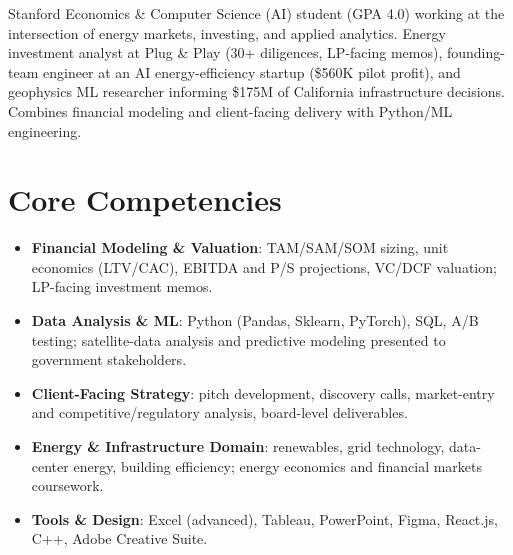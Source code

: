 \documentclass[11pt,a4paper,sans]{moderncv}
\begin{document}
\makecvtitle


\vspace{6pt}
\small{Stanford Economics \& Computer Science (AI) student (GPA 4.0) working at the intersection of energy markets, investing, and applied analytics. Energy investment analyst at Plug \& Play (30+ diligences, LP-facing memos), founding-team engineer at an AI energy-efficiency startup (\$560K pilot profit), and geophysics ML researcher informing \$175M of California infrastructure decisions. Combines financial modeling and client-facing delivery with Python/ML engineering.}


\section{Core Competencies}
\vspace{1pt}
\begin{itemize}

\item \textbf{Financial Modeling \& Valuation}: TAM/SAM/SOM sizing, unit economics (LTV/CAC), EBITDA and P/S projections, VC/DCF valuation; LP-facing investment memos.

\item \textbf{Data Analysis \& ML}: Python (Pandas, Sklearn, PyTorch), SQL, A/B testing; satellite-data analysis and predictive modeling presented to government stakeholders.

\item \textbf{Client-Facing Strategy}: pitch development, discovery calls, market-entry and competitive/regulatory analysis, board-level deliverables.

\item \textbf{Energy \& Infrastructure Domain}: renewables, grid technology, data-center energy, building efficiency; energy economics and financial markets coursework.

\item \textbf{Tools \& Design}: Excel (advanced), Tableau, PowerPoint, Figma, React.js, C++, Adobe Creative Suite.

\end{itemize}
\end{document}
